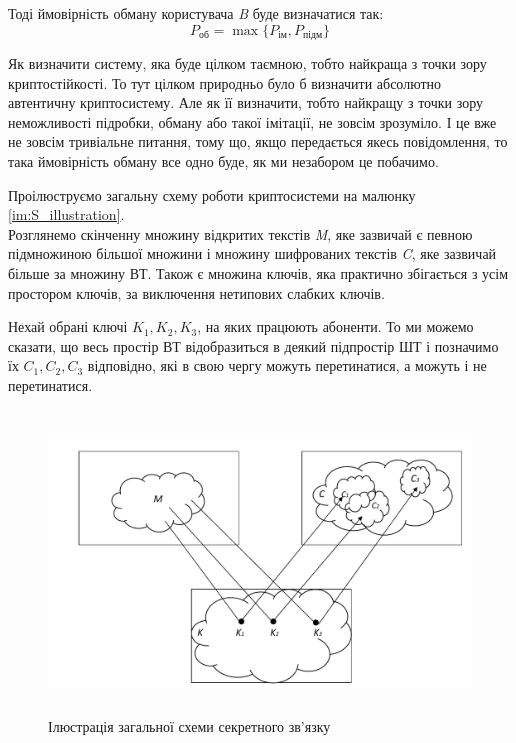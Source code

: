 Тоді ймовірність обману користувача \textsl{B} буде визначатися так: 
\begin{equation}  \label{eq:PLIE}  
P_{\text{об}} = \max\{P_{\text{ім}},P_{\text{підм}}\}
\end{equation} 

Як визначити систему, яка буде цілком таємною, тобто найкраща з точки зору криптостійкості. То тут цілком природньо було б визначити абсолютно автентичну криптосистему. Але як її визначити, тобто найкращу з точки зору неможливості підробки, обману або такої імітації, не зовсім зрозуміло. І це вже не зовсім тривіальне питання, тому що, якщо передається якесь повідомлення, то така ймовірність обману все одно буде, як ми незабором це побачимо. \\ \par

Проілюструємо загальну схему роботи криптосистеми
на малюнку \eqref {im:S_illustration}. \\
Розглянемо скінченну множину відкритих текстів \textsl{M}, яке зазвичай є певною підмножиною більшої множини і множину шифрованих текстів 
\textsl{C}, яке зазвичай більше за множину ВТ.
Також є множина ключів, яка практично збігається з усім простором ключів, за виключення нетипових слабких ключів. \par
Нехай обрані ключі $ K_1, K_2, K_3 $, на яких працюють абоненти. То ми можемо сказати, що весь простір ВТ відобразиться в деякий підпростір ШТ і позначимо їх $ C_1, C_2, C_3 $ відповідно, які в свою чергу можуть перетинатися, а можуть і не перетинатися.

\begin{figure}[h]
\includegraphics[height=8cm,width=\textwidth,]{illustration}
\caption{Ілюстрація загальної схеми секретного зв'язку}
\label{im:S_illustration}
\end{figure} 
\pagebreak

